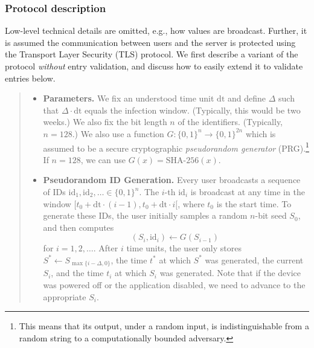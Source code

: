 \documentclass{article}
\begin{document}
\subsubsection{Protocol description} 

Low-level technical details are omitted, e.g., how values are broadcast. Further, it is assumed the communication between users and the server is protected using the Transport Layer Security (TLS)  protocol. We first describe a variant of the protocol {\em without} entry validation, and discuss how to easily extend it to validate entries below.


\newcommand{\id}{\mathrm{id}}
\newcommand{\dt}{\mathrm{dt}}

\begin{quote}
\begin{itemize}
    \item {\bf Parameters.} We fix an understood time unit $\dt$ and define $\Delta$ such that $\Delta \cdot \dt$ equals the infection window. (Typically, this would be two weeks.) We also fix the bit length $n$ of the identifiers. (Typically, $n = 128$.) We also use a function $G: \{0,1\}^n \to \{0,1\}^{2n}$ which is assumed to be a secure cryptographic {\em pseudorandom generator} (PRG).\footnote{This means that its output, under a random input, is indistinguishable from a random string to a computationally bounded adversary.} If $n = 128$, we can use $G(x) = \textrm{SHA-256}(x)$.
    \item {\bf Pseudorandom ID Generation.} Every user broadcasts a sequence of IDs $\id_1, \id_2, \ldots \in \{0,1\}^n$.  The $i$-th $\id_i$ is broadcast at any time in the window $[t_0 + \dt\cdot (i-1), t_0 + \dt\cdot i[$, where $t_0$ is the start time. To generate these IDs, the user initially samples a random $n$-bit seed $S_0$, and then computes
\begin{displaymath}
(S_i, \id_i) \gets G(S_{i-1}) \;
\end{displaymath}
for $i = 1,2, \ldots$.
After $i$ time units, the user only stores $S^* \gets S_{\max\{i-\Delta,0\}}$, the time $t^*$ at which $S^*$ was generated, the current $S_i$, and the time $t_i$ at which $S_i$ was generated. Note that if the device was powered off or the application disabled, we need to advance to the appropriate $S_i$. 


\end{itemize}
\end{quote}
\end{document}

